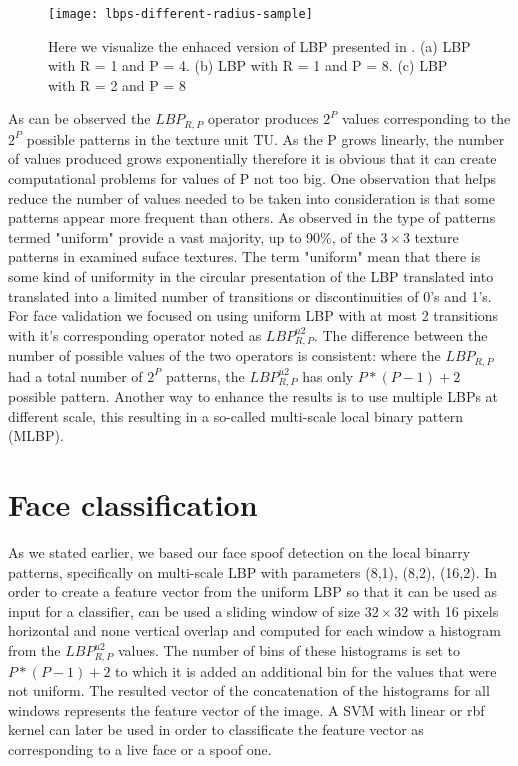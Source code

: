 \begin{figure}[h]
	\begin{center}
		\texttt{[image: lbps-different-radius-sample]}
	\end{center}
	\caption[Enhanced LBP visualisation]{Here we visualize the enhaced version of LBP presented in \cite{OjalaPM02}. (a) LBP with R = 1 and P = 4. (b) LBP with R = 1 and P = 8. (c) LBP with R = 2 and P = 8}
\end{figure}
As can be observed the $LBP_{R,P}$ operator produces $2^P$ values corresponding to the $2^P$ possible patterns in the texture unit TU. As the P grows linearly, the number of values produced grows exponentially therefore it is obvious that it can create computational problems for values of P not too big. 
One observation that helps reduce the number of values needed to be taken into consideration is that some patterns appear more frequent than others. As observed in \cite{OjalaPM02} the type of patterns termed "uniform" provide a vast majority, up to 90\%, of the $3\times3$ texture patterns in examined suface textures. The term "uniform" mean that there is some kind of uniformity in the circular presentation of the LBP translated into translated into a limited number of transitions or discontinuities of 0's and 1's. For face validation we focused on using uniform LBP with at most 2 transitions with it's corresponding operator noted as $LBP_{R,P}^{u2}$. The difference between the number of possible values of the two operators is consistent: where the $LBP_{R,P}$ had a total number of $2^P$ patterns, the $LBP_{R,P}^{u2}$ has only $P*(P-1)+2$ possible pattern.
Another way to enhance the results is to use multiple LBPs at different scale, this resulting in a so-called multi-scale local binary pattern (MLBP).

\section{Face classification}
As we stated earlier, we based our face spoof detection on the local binarry patterns, specifically on multi-scale LBP with parameters {(8,1), (8,2), (16,2)}. In order to create a feature vector from the uniform LBP so that it can be used as input for a classifier, can be used a sliding window of size $32\times32$ with 16 pixels horizontal and none vertical overlap and computed for each window a histogram from the $LBP_{R,P}^{u2}$ values. The number of bins of these histograms is set to $P*(P-1) + 2$ to which it is added an additional bin for the values that were not uniform. The resulted vector of the concatenation of the histograms for all windows represents the feature vector of the image. A SVM with linear or rbf kernel can later be used in order to classificate the feature vector as corresponding to a live face or a spoof one.

